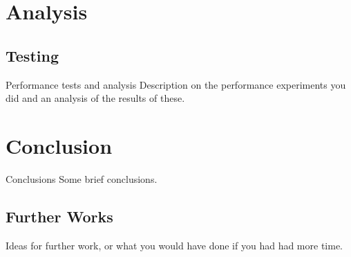 \documentclass[a4paper,11pt]{article}
\begin{document}
 \section{Analysis}
 
 \subsection{Testing}
Performance tests and analysis Description on the performance experiments you did and an analysis
of the results of these.
 
 \section{Conclusion}
Conclusions Some brief conclusions.
 
\subsection{Further Works}
 Ideas for further work, or what you would have done if you had had more time.
\end{document}
